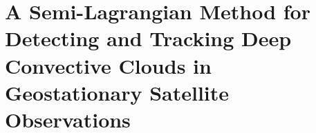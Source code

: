 \chapter{A Semi-Lagrangian Method for Detecting and Tracking Deep Convective Clouds in Geostationary Satellite Observations}




